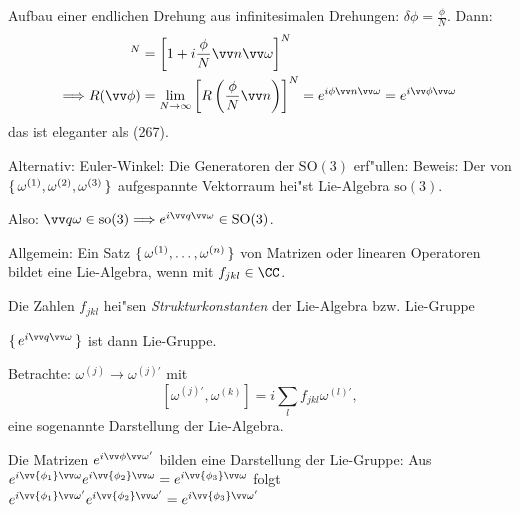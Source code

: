 \documentclass[a4paper]{scrartcl}
\begin{document}
{Aufbau einer endlichen Drehung aus infinitesimalen Drehungen: $\delta \phi = \frac \phi N$. Dann:
\begin{align}
[ R( \delta \phi \vv n) ]^N & = \left[ 1 + i \frac \phi N \vv n \vv \omega\right]^N \notag \\
\Longrightarrow R(\vv \phi)&  = \lim_{N \rightarrow \infty} \left[  R \left( \frac \phi N \vv n \right) \right]^N = e^{i \phi \vv n \vv \omega} = e^{i \vv \phi \vv \omega}
\end{align}
das ist eleganter als (267).

Alternativ: Euler-Winkel:
Die Generatoren der $\mathrm{SO}(3)$ erf"ullen:
Beweis:
Der von $\set{ \omega^{(1)}, \omega^{(2)}, \omega^{(3)} }$ aufgespannte Vektorraum hei"st Lie-Algebra $\mathrm{so}(3)$.

Also: $\vv q \omega \in \mathrm{so}(3) \Longrightarrow e^{i \vv q \vv \omega} \in \mathrm{SO}(3)$.

Allgemein: Ein Satz $\set{ \omega^{(1)}, \ldots, \omega^{(n)} }$ von Matrizen oder linearen Operatoren bildet eine Lie-Algebra, wenn
mit $f_{jkl} \in \CC$.

Die Zahlen $f_{jkl}$ hei"sen \emph{Strukturkonstanten} der Lie-Algebra bzw. Lie-Gruppe

$\set{ e^{i \vv q \vv \omega} }$ ist dann Lie-Gruppe.

Betrachte: $\omega^{(j)} \longrightarrow \omega^{(j)'}$ mit
$$[\omega^{(j)'}, \omega^{(k)} ] = i \sum_l f_{jkl} \omega^{(l)'},$$
eine sogenannte Darstellung der Lie-Algebra.

Die Matrizen $e^{i \vv \phi \vv \omega'}$ bilden eine Darstellung der Lie-Gruppe: Aus $e^{i \vv{\phi_1} \vv \omega} e^{i \vv{\phi_2} \vv \omega} = e^{i \vv{\phi_3} \vv \omega}$ folgt $e^{i \vv{\phi_1} \vv \omega'} e^{i \vv{\phi_2} \vv \omega'} = e^{i \vv{\phi_3} \vv \omega'}$

}
\end{document}
